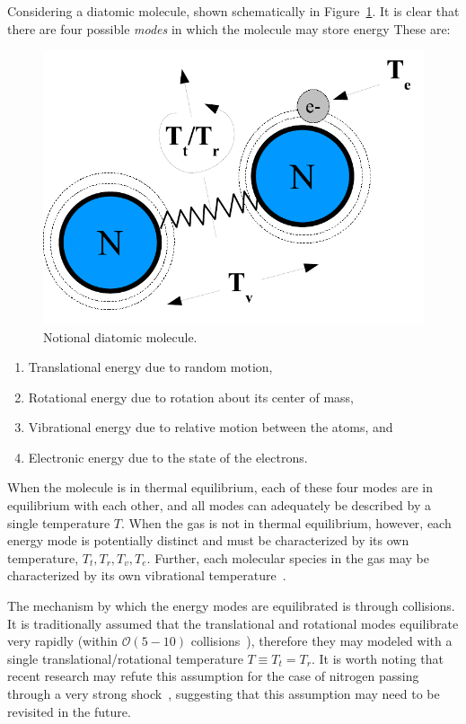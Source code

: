 Considering a diatomic molecule, shown schematically in Figure~\ref{fig:notional_diatomic}. It is clear that there are four possible \emph{modes} in which the molecule may store energy  These are:
\begin{figure}[hbtp]
  \begin{center}
    \includegraphics[width=.7\textwidth]{figures/misc/N2}
    \caption{Notional diatomic molecule.\label{fig:notional_diatomic}}
  \end{center}
\end{figure}
\begin{enumerate}
  \item Translational energy due to random motion,
  \item Rotational energy due to rotation about its center of mass,
  \item Vibrational energy due to relative motion between the atoms, and
  \item Electronic energy due to the state of the electrons.
\end{enumerate}
When the molecule is in thermal equilibrium, each of these four modes are in equilibrium with each other, and all modes can adequately be described by a single temperature $T$.  When the gas is not in thermal equilibrium, however, each energy mode is potentially distinct and must be characterized by its own temperature, $T_t, T_r, T_v, T_e$.  Further, each molecular species in the gas may be characterized by its own vibrational temperature~\cite{candler_thesis}.

The mechanism by which the energy modes are equilibrated is through collisions.  It is traditionally assumed that the translational and rotational modes equilibrate very rapidly (within $\mathcal{O}(5-10)$ collisions~\cite{candler_thesis,lordi_mates_rotational_relaxation}), therefore they may modeled with a single translational/rotational temperature $T\equiv T_t=T_r$. It is worth noting that recent research may refute this assumption for the case of nitrogen passing through a very strong shock~\cite{park_N2_rotational_relaxation}, suggesting that this assumption may need to be revisited in the future.

